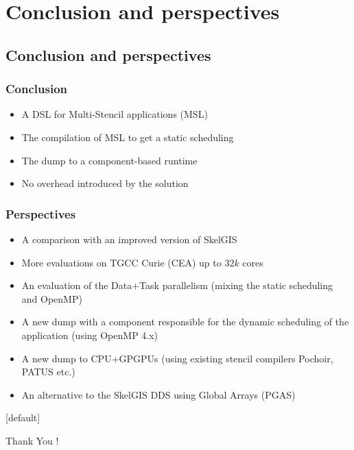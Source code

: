 \documentclass{beamer}
\makeatletter
\newenvironment{withoutheadline}{
        \setbeamertemplate{headline}[default]
        \def\beamer@entrycode{\vspace*{-\headheight}}
    }{}
\makeatother
\begin{document}
\section{Conclusion and perspectives}
\subsection{Conclusion and perspectives}
\begin{frame}
\frametitle{Conclusion}
\begin{itemize}
\item A DSL for Multi-Stencil applications (MSL)
\item The compilation of MSL to get a static scheduling
\item The dump to a component-based runtime
\item No overhead introduced by the solution
\end{itemize}
\end{frame}

\begin{frame}
\frametitle{Perspectives}
\begin{itemize}
\item A comparison with an improved version of SkelGIS
\item More evaluations on TGCC Curie (CEA) up to $32k$ cores
\item An evaluation of the Data+Task parallelism (mixing the static scheduling and OpenMP)
\item A new dump with a component responsible for the dynamic scheduling of the application (using OpenMP 4.x)
\item A new dump to CPU+GPGPUs (using existing stencil compilers Pochoir, PATUS etc.)
\item An alternative to the SkelGIS DDS using Global Arrays (PGAS)
\end{itemize}
\end{frame}

\begin{withoutheadline}
\begin{frame}{}
\begin{center}
\huge Thank You !
\end{center}
\end{frame}
\end{withoutheadline}
\end{document}
